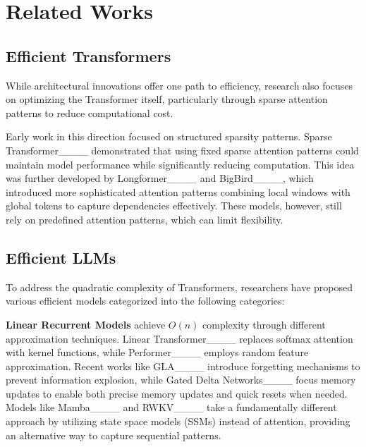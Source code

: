 \section{Related Works}
\label{related-works}

\subsection{Efficient Transformers}


While architectural innovations offer one path to efficiency, research also focuses on optimizing the Transformer itself, particularly through sparse attention patterns to reduce computational cost.

Early work in this direction focused on structured sparsity patterns. Sparse Transformer____ demonstrated that using fixed sparse attention patterns could maintain model performance while significantly reducing computation. This idea was further developed by Longformer____ and BigBird____, which introduced more sophisticated attention patterns combining local windows with global tokens to capture dependencies effectively. 
These models, however, still rely on predefined attention patterns, which can limit flexibility. \swt

\subsection{Efficient LLMs}

To address the quadratic complexity of Transformers, researchers have proposed various efficient models categorized into the following categories:

\textbf{Linear Recurrent Models} achieve $O(n)$ complexity through different approximation techniques. Linear Transformer____ replaces softmax attention with kernel functions, while Performer____ employs random feature approximation. Recent works like GLA____ introduce forgetting mechanisms to prevent information explosion, while Gated Delta Networks____ focus memory updates to enable both precise memory updates and quick resets when needed. Models like Mamba____ and RWKV____ take a fundamentally different approach by utilizing state space models (SSMs) instead of attention, providing an alternative way to capture sequential patterns.

